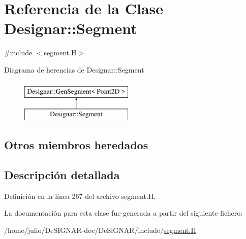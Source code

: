 \hypertarget{class_designar_1_1_segment}{}\section{Referencia de la Clase Designar\+:\+:Segment}
\label{class_designar_1_1_segment}


{\ttfamily \#include $<$segment.\+H$>$}

Diagrama de herencias de Designar\+:\+:Segment\begin{figure}[H]
\begin{center}
\leavevmode
\includegraphics[height=2.000000cm]{class_designar_1_1_segment}
\end{center}
\end{figure}
\subsection*{Otros miembros heredados}


\subsection{Descripción detallada}


Definición en la línea 267 del archivo segment.\+H.



La documentación para esta clase fue generada a partir del siguiente fichero\+:\begin{DoxyCompactItemize}
\item 
/home/julio/\+De\+S\+I\+G\+N\+A\+R-\/doc/\+De\+Si\+G\+N\+A\+R/include/\hyperlink{segment_8_h}{segment.\+H}\end{DoxyCompactItemize}
